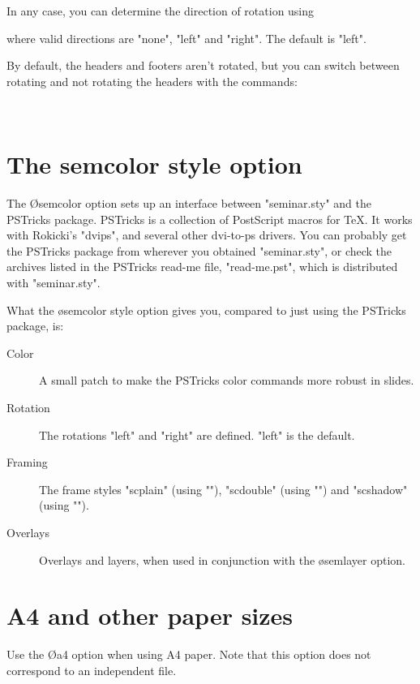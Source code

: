 \begin{slide}
In any case, you can determine the direction of rotation using
\begin{MD}
\end{MD}
where valid directions are "none", "left" and "right". The default is "left".

By default, the headers and footers aren't rotated, but you can switch between
rotating and not rotating the headers with the commands:
\begin{MD}
  \rotateheaderstrue\\
  \rotateheadersfalse
\end{MD}

\section{The semcolor style option\label{S-semcolor}}

The \O{semcolor} option sets up an interface between "seminar.sty" and the
PSTricks package. PSTricks is a collection of PostScript macros for \TeX. It
works with Rokicki's "dvips", and several other dvi-to-ps drivers. You can
probably get the PSTricks package from wherever you obtained "seminar.sty", or
check the archives listed in the PSTricks read-me file, "read-me.pst", which
is distributed with "seminar.sty".

What the \o{semcolor} style option gives you, compared to just using the
PSTricks package, is:
\begin{description}
\item[Color] A small patch to make the PSTricks color commands more robust in
slides.
\item[Rotation] The rotations "left" and "right" are defined. "left" is the
default.
\item[Framing] The frame styles "scplain" (using "\psframebox"), "scdouble"
(using "\psdblframebox") and "scshadow" (using "\psshadowbox").
\item[Overlays] Overlays and layers, when used in conjunction with the
\o{semlayer} option.
\end{description}

\section{A4 and other paper sizes\label{S-papersizes}}

Use the \O{a4} option when using A4 paper. Note that this option does not
correspond to an independent file.


\end{slide}
